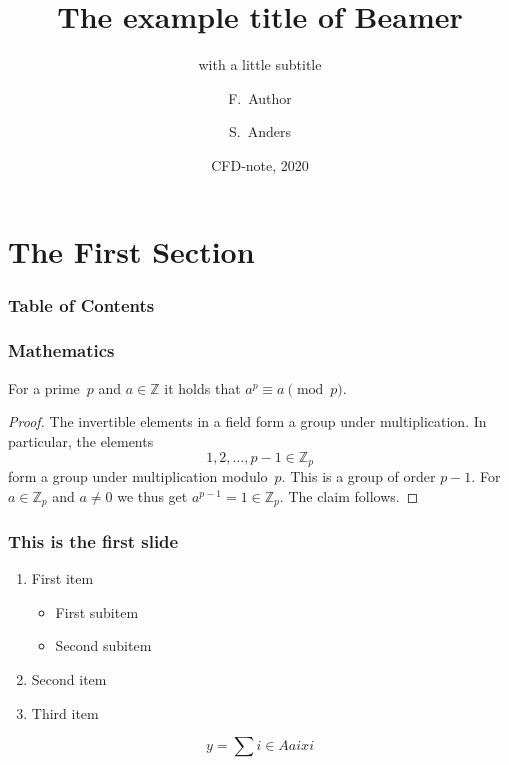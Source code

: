 \documentclass[MathSerif]{beamer}
\title[CFD-note] %
{The example title of Beamer}
\subtitle{with a little subtitle}
\author[Author, Anders] %
{F.~Author\inst{1} \and S.~Anders\inst{2}}
\institute[] %
{
  \inst{1}%
  Institute of Computer Science\\
  University Here
  \and
  \inst{2}%
  Institute of Theoretical Philosophy\\
  University There
}
\date[Date 2004] %
{CFD-note, 2020}
\begin{document}
\section[First]{The First Section}
\begin{frame}
	\frametitle{Table of Contents}
	\tableofcontents[]
\end{frame}

\begin{frame}
    \frametitle{Mathematics}

    \begin{theorem}
        For a prime~\(p\) and \(a \in \mathbb{Z}\) it holds that \(a^p \equiv a \pmod{p}\).
    \end{theorem}

    \begin{proof}
        The invertible elements in a field form a group under multiplication.
        In particular, the elements
        \begin{equation*}
            1, 2, \ldots, p - 1 \in \mathbb{Z}_p
        \end{equation*}
        form a group under multiplication modulo~\(p\).
        This is a group of order \(p - 1\).
        For \(a \in \mathbb{Z}_p\) and \(a \neq 0\) we thus get \(a^{p-1} = 1 \in \mathbb{Z}_p\).
        The claim follows.
    \end{proof}
\end{frame}


\begin{frame}

\frametitle{This is the first slide}
\begin{enumerate}
\item First item
\begin{itemize}
\item First subitem
\item Second subitem
\end{itemize}
\item Second item
\item Third item
\end{enumerate}
\[ y = \sum {i \in A} a i x i \]
\end{frame}
  

  
\end{document}
